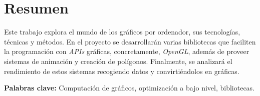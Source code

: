 \chapter*{Resumen}
Este trabajo explora el mundo de los gráficos por ordenador, sus tecnologías, técnicas y métodos. En el proyecto se desarrollarán varias bibliotecas que faciliten la programación con \textit{APIs} gráficas, concretamente, \textit{OpenGL}, además de proveer sistemas de animación y creación de polígonos. Finalmente, se analizará el rendimiento de estos sistemas recogiendo datos y convirtiéndolos en gráficas.

\vspace{.5cm}

\textbf{Palabras clave:} Computación de gráficos, optimización a bajo nivel, bibliotecas.